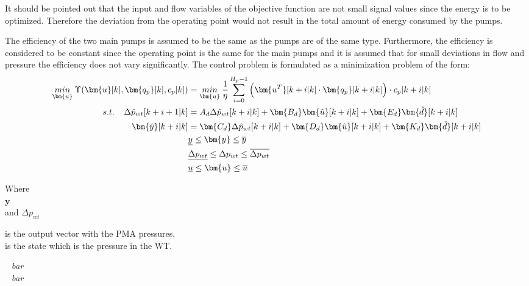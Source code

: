 It should be pointed out that the input and flow variables of the objective function are not small signal values since the energy is to be optimized. Therefore the deviation from the operating point would not result in the total amount of energy consumed by the pumps. 

The efficiency of the two main pumps is assumed to be the same as the pumps are of the same type. Furthermore, the efficiency is considered to be constant since the operating point is the same for the main pumps and it is assumed that for small deviations in flow and pressure the efficiency does not vary significantly. 
The control problem is formulated as a minimization problem of the form:
\begin{align}
\underset{\bm{u}}{min} \:  \Upsilon(\bm{u}[k],\bm{q_p}[k],c_p[k]) &= \underset{\bm{u}}{min} \: \frac{1}{\eta} \sum_{i=0}^{H_p-1} \Big( \bm{u^T}[k+i|k] \cdot \bm{q_{p}}[k+i|k]\Big)\cdot c_p[k+i|k] \label{eqcost1} \\
%
\newline
s.t. \:\:\:\:\:  \Delta \hat{p}_{wt} [k+i+1|k] &= A_d \Delta \hat{p}_{wt}[k+i|k]  + \bm{B_d} \bm{\hat{u}}[k+i|k] + \bm{E_d} \bm{\hat{d}}[k+i|k] \label{dyn}  \\ 
%
\bm{\hat{y}}[k+i|k] &= \bm{C_d} \Delta \hat{p}_{wt}[k+i|k] + \bm{D_d} \bm{\hat{u}}[k+i|k] + \bm{K_d} \bm{\hat{d}}[k+i|k] \\
%
& \underline{y} \leq \bm{y} \leq \overline{y} \\
%
& \underline{\Delta p_{wt}} \leq \Delta p_{wt} \leq \overline{\Delta p_{wt}} \\
%
& \underline{u} \leq \bm{u} \leq \overline{u} \label{eqconst2} 
\end{align}

 \begin{minipage}[t]{0.24\textwidth}
 Where\\
 \hspace*{8mm} $\bm{y}$ \\
and \hspace*{0.7mm} $\Delta p_{wt}$ 
 \end{minipage}
 \begin{minipage}[t]{0.63\textwidth}
 \vspace*{2mm}
 is the output vector with the PMA pressures,\\
 is the state which is the pressure in the WT.
 \end{minipage}
 \begin{minipage}[t]{0.10\textwidth}
 \vspace*{2mm}
 \textcolor{White}{te}$\unit{bar}$\\
 \textcolor{White}{te}$\unit{bar}$
 \end{minipage}

